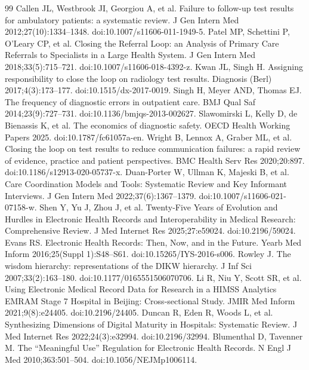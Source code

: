 \documentclass[3p,twocolumn]{elsarticle}
\begin{document}
\begin{thebibliography}{99}
\setlength{\itemsep}{2pt plus 0.5pt}\setlength{\parsep}{0pt}
\label{r1} Callen JL, Westbrook JI, Georgiou A, et al. Failure to follow-up test results for ambulatory patients: a systematic review. J Gen Intern Med 2012;27(10):1334--1348. doi:10.1007/s11606-011-1949-5.
\label{r2} Patel MP, Schettini P, O'Leary CP, et al. Closing the Referral Loop: an Analysis of Primary Care Referrals to Specialists in a Large Health System. J Gen Intern Med 2018;33(5):715--721. doi:10.1007/s11606-018-4392-z.
\label{r3} Kwan JL, Singh H. Assigning responsibility to close the loop on radiology test results. Diagnosis (Berl) 2017;4(3):173--177. doi:10.1515/dx-2017-0019.
\label{r4} Singh H, Meyer AND, Thomas EJ. The frequency of diagnostic errors in outpatient care. BMJ Qual Saf 2014;23(9):727--731. doi:10.1136/bmjqs-2013-002627.
\label{r5} Slawomirski L, Kelly D, de Bienassis K, et al. The economics of diagnostic safety. OECD Health Working Papers 2025. doi:10.1787/fc61057a-en.
\label{r6} Wright B, Lennox A, Graber ML, et al. Closing the loop on test results to reduce communication failures: a rapid review of evidence, practice and patient perspectives. BMC Health Serv Res 2020;20:897. doi:10.1186/s12913-020-05737-x.
\label{r7} Duan-Porter W, Ullman K, Majeski B, et al. Care Coordination Models and Tools: Systematic Review and Key Informant Interviews. J Gen Intern Med 2022;37(6):1367--1379. doi:10.1007/s11606-021-07158-w.
\label{r8} Shen Y, Yu J, Zhou J, et al. Twenty-Five Years of Evolution and Hurdles in Electronic Health Records and Interoperability in Medical Research: Comprehensive Review. J Med Internet Res 2025;27:e59024. doi:10.2196/59024.
\label{r9} Evans RS. Electronic Health Records: Then, Now, and in the Future. Yearb Med Inform 2016;25(Suppl 1):S48--S61. doi:10.15265/IYS-2016-s006.
\label{r10} Rowley J. The wisdom hierarchy: representations of the DIKW hierarchy. J Inf Sci 2007;33(2):163--180. doi:10.1177/0165551506070706.
\label{r11} Li R, Niu Y, Scott SR, et al. Using Electronic Medical Record Data for Research in a HIMSS Analytics EMRAM Stage 7 Hospital in Beijing: Cross-sectional Study. JMIR Med Inform 2021;9(8):e24405. doi:10.2196/24405.
\label{r12} Duncan R, Eden R, Woods L, et al. Synthesizing Dimensions of Digital Maturity in Hospitals: Systematic Review. J Med Internet Res 2022;24(3):e32994. doi:10.2196/32994.
\label{r13} Blumenthal D, Tavenner M. The ``Meaningful Use'' Regulation for Electronic Health Records. N Engl J Med 2010;363:501--504. doi:10.1056/NEJMp1006114.

\end{thebibliography}
\end{document}
